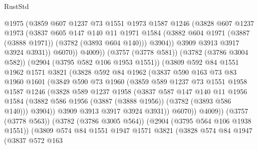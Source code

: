\begin{lexlean}{RustStd}
\begin{coremodule}
                    @1975
                    (@3859
                      @607
                      @1237
                      @73
                      @1551
                      @1973
                      @1587
                      @1246
                      (@3828
                        @607
                        @1237
                        @1973
                        (@3837
                          @605
                          @147
                          @140
                          @11
                          @1971
                          @1584
                          (@3882 @604 @1971 (@3887 (@3888 @1971)) (@3782 (@3893 @604 @140)))
                          @3904))
                      @3909
                      @3913
                      @3917
                      @3924
                      @3931))
                  @6070))
              @4009))
          (@3757 (@3778 @581))
          (@3782 (@3786 @3004 @582))
          (@2904 (@3795 @582 @106 @1953 @1551))
          (@3809
            @592
            @84
            @1551
            @1962
            @1571
            @3821
            (@3828
              @592
              @84
              @1962
              (@3837
                @590
                @163
                @73
                @83
                @1960
                @1601
                (@3849
                  @590
                  @73
                  @1960
                  (@3859
                    @589
                    @1237
                    @73
                    @1551
                    @1958
                    @1587
                    @1246
                    (@3828
                      @589
                      @1237
                      @1958
                      (@3837
                        @587
                        @147
                        @140
                        @11
                        @1956
                        @1584
                        (@3882 @586 @1956 (@3887 (@3888 @1956)) (@3782 (@3893 @586 @140)))
                        @3904))
                    @3909
                    @3913
                    @3917
                    @3924
                    @3931))
                @6070))
            @4009))
        (@3757 (@3778 @563))
        (@3782 (@3786 @3005 @564))
        (@2904 (@3795 @564 @106 @1938 @1551))
        (@3809
          @574
          @84
          @1551
          @1947
          @1571
          @3821
          (@3828
            @574
            @84
            @1947
            (@3837
              @572
              @163

\end{coremodule}
\end{lexlean}

